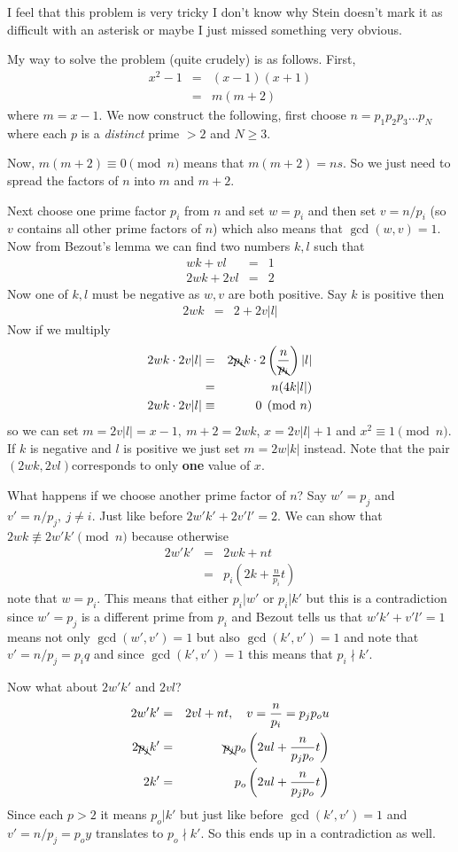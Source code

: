 \documentclass[aps,preprint,preprintnumbers,nofootinbib,showpacs,prd]{revtex4-1}
\newcommand{\nbea}{\begin{eqnarray*}}
\newcommand{\neea}{\end{eqnarray*}}
\begin{document}
I feel that this problem is very tricky I don't know why Stein doesn't mark it as difficult with an asterisk or maybe I just missed something very obvious.

My way to solve the problem (quite crudely) is as follows. First,
%
\nbea
x^2 - 1 & = & (x - 1)(x + 1) \\
& = & m (m + 2)
\neea
%
where $m = x - 1$. We now construct the following, first choose $n = p_1 p_2 p_3 \dots p_N$ where each $p$ is a {\it distinct} prime $> 2$ and $N \ge 3$.

Now, $m(m+2) \equiv 0 \pmod{n}$ means that $m(m+2) = ns$. So we just need to spread the factors of $n$ into $m$ and $m+2$.

Next choose one prime factor $p_i$ from $n$ and set $w = p_i$ and then set $v = n/p_i$ (so $v$ contains all other prime factors of $n$) which also means that $\gcd(w,v) = 1$. Now from Bezout's lemma we can find two numbers $k, l$ such that
%
\nbea
wk + vl & = & 1 \\
2wk + 2vl & = & 2
\neea
%
Now one of $k,l$ must be negative as $w,v$ are both positive. Say $k$ is positive then
%
\nbea
2wk & = & 2 + 2v|l|
\neea
%
Now if we multiply 
%
\nbea
2wk \cdot 2v|l| & = & 2 \bcancel{p_i} k \cdot 2 \left ( \frac{n}{\bcancel{p_i}} \right ) |l| \\
& = & n (4 k |l|) \\
2wk \cdot 2v|l| & \equiv & 0 \pmod{n}
\neea
%
so we can set $m = 2v|l| = x - 1, ~ m + 2 = 2wk$, $x = 2v|l| + 1$ and $x^2 \equiv 1 \pmod{n}$. If $k$ is negative and $l$ is positive we just set $m = 2w|k|$ instead. Note that the pair $(2wk, 2vl)$corresponds to only {\bf one} value of $x$.

What happens if we choose another prime factor of $n$? Say $w' = p_j$ and $v' = n/p_j, ~j \neq i$. Just like before $2w'k' + 2v'l' = 2$. We can show that $2wk \not\equiv 2w'k' \pmod{n}$ because otherwise
%
\nbea
2w'k' & = & 2wk +nt\\
& = & p_i \left (2 k + \frac{n}{p_i}t \right )
\neea
%
note that $w = p_i$. This means that either $p_i|w'$ or $p_i|k'$ but this is a contradiction since $w' = p_j$ is a different prime from $p_i$ and Bezout tells us that $w'k' + v'l' = 1$ means not only $\gcd(w', v') = 1$ but also $\gcd(k',v') = 1$ and note that $v' = n/p_j = p_i q$ and since $\gcd(k',v') = 1$ this means that $p_i \nmid k'$.

Now what about $2w'k'$ and $2vl$?
%
\nbea
2w'k' & = & 2vl +nt , ~~~ v = \frac{n}{p_i} = p_j p_o u\\
2 \bcancel{p_j}k' & = & \bcancel{p_j}p_o \left (2 ul + \frac{n}{p_j p_o}t \right ) \\
2 k' & = & p_o \left (2 ul + \frac{n}{p_j p_o}t \right )
\neea
%
Since each $p > 2$ it means $p_o | k'$ but just like before $\gcd(k',v') = 1$ and $v' = n/p_j = p_o y$ translates to $p_o \nmid k'$. So this ends up in a contradiction as well. 
\end{document}
